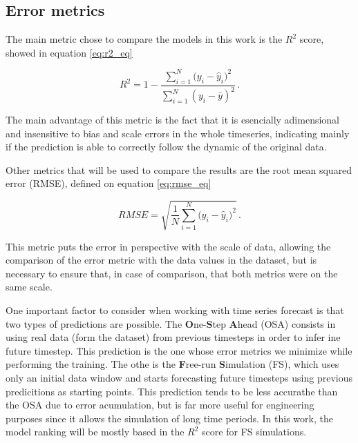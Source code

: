 \documentclass[conference]{IEEEtran}
\begin{document}
\subsection{Error metrics}

The main metric chose to compare the models in this work is the $R^2$ score, showed in equation \ref{eq:r2_eq}

\begin{equation}\label{eq:r2_eq}
    R^2 = 1 - \frac{\sum_{i=1}^N{(y_i - \hat{y}_i})^2}{\sum_{i=1}^N{(y_i - \bar{y})^2}}\,.
\end{equation}

The main advantage of this metric is the fact that it is esencially adimensional and
insensitive to bias and scale errors in the whole timeseries, indicating mainly if the prediction
is able to correctly follow the dynamic of the original data.

Other metrics that will be used to compare the results are the root mean squared error (RMSE), 
defined on equation \ref{eq:rmse_eq} 


\begin{equation}\label{eq:rmse_eq}
    RMSE = \sqrt{\frac{1}{N}\sum_{i=1}^N{(y_i - \hat{y}_i})^2}\,.
\end{equation}

This metric puts the error in perspective with the scale of data, allowing the comparison
of the error metric with the data values in the dataset, but is necessary to ensure that, in case of comparison,
that both metrics were on the same scale.

One important factor to consider when working with time series forecast is that two types
of predictions are possible. The \textbf{O}ne-\textbf{S}tep \textbf{A}head (OSA) consists in using
real data (form the dataset) from previous timesteps in order to infer ine future timestep. This 
prediction is the one whose error metrics we minimize while performing the training.
The othe is the \textbf{F}ree-run \textbf{S}imulation (FS), which uses only an initial data window
and starts forecasting future timesteps using previous predicitions as starting points. This
prediction tends to be less accurathe than the OSA due to error acumulation, but is far more useful
for engineering purposes since it allows the simulation of long time periods. In this work, the model
ranking will be mostly based in the $R^2$ score for FS simulations.
\end{document}
